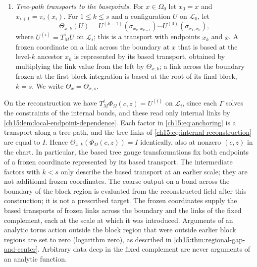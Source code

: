 \begin{definition}
\begin{enumerate}
\item \emph{Tree-path transports to the basepoints.} For $x\in\Omega_0$ let $x_0=x$ and $x_{i+1}=\pi_i(x_i)$. For $1\le k\le s$ and a configuration $U$ on $\mathcal L_0$, let
\begin{equation}\label{ch15:eq:anchoring}
 \Theta_{x,k}(U)=U^{(k-1)}(\sigma_{x_k,x_{k-1}})\cdots
                         U^{(0)}(\sigma_{x_1,x_0}),
\end{equation}
where $U^{(i)}=T_M^iU$ on $\mathcal L_i$; this is a transport with endpoints $x_k$ and $x$. A frozen coordinate on a link across the boundary at $x$ that is based at the level-$k$ ancestor $x_k$ is represented by its based transport, obtained by multiplying the link value from the left by $\Theta_{x,k}$; a link across the boundary frozen at the first block integration is based at the root of its final block, $k=s$. We write $\Theta_x=\Theta_{x,s}$.
\end{enumerate}
\end{definition}

On the reconstruction we have $T_M^i\Phi_\Omega(c,z)=U^{(i)}$ on $\mathcal L_i$, since each $\Gamma$ solves the constraints of the internal bonds, and these read only internal links by \cref{ch15:lem:local-endpoint-dependence}. Each factor in \eqref{ch15:eq:anchoring} is a transport along a tree path, and the tree links of \eqref{ch15:eq:internal-reconstruction} are equal to $I$. Hence $\Theta_{x,k}(\Phi_\Omega(c,z))=I$ identically, also at nonzero $(c,z)$ in the chart. In particular, the based tree gauge transformations fix both endpoints of a frozen coordinate represented by its based transport. The intermediate factors with $k<s$ only describe the based transport at an earlier scale; they are not additional frozen coordinates. The coarse output on a bond across the boundary of the block region is evaluated from the reconstructed field after this construction; it is not a prescribed target. The frozen coordinates supply the based transports of frozen links across the boundary and the links of the fixed complement, each at the scale at which it was introduced. Arguments of an analytic torus action outside the block region that were outside earlier block regions are set to zero (logarithm zero), as described in \cref{ch15:thm:regional-gap-and-center}. Arbitrary data deep in the fixed complement are never arguments of an analytic function.

